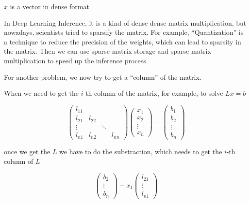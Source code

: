 $x$ is a vector in dense format

\begin{note}
    In Deep Learning Inference, it is a kind of dense dense matrix multiplication, but nowadays, scientists tried to sparsify the matrix. For example, ``Quantization'' is a technique to reduce the precision of the weights, which can lead to sparsity in the matrix. Then we can use sparse matrix storage and sparse matrix multiplication to speed up the inference process.
\end{note}

\begin{eg}
    For another problem, we now try to get a ``column'' of the matrix.
\end{eg}

When we need to get the $i$-th column of the matrix, for example, to solve $Lx = b$

\begin{equation*}
  \begin{pmatrix}
    l_{11} &&& \\
    l_{21} & l_{22} && \\
    \vdots&& \ddots & \\
    l_{n1} & l_{n2} & & l_{nn}
  \end{pmatrix}
  \begin{pmatrix}
    x_1 \\ x_2 \\ \vdots \\ x_n
  \end{pmatrix}
=
\begin{pmatrix}
  b_1\\ b_2 \\ \vdots \\ b_n
\end{pmatrix}
\end{equation*}

once we get the $L$ we have to do the substraction, which needs to get the $i$-th column of $L$

\begin{equation*}
  \begin{pmatrix}
    b_2 \\ \vdots \\ b_n
  \end{pmatrix}
- x_1
\begin{pmatrix}
  l_{21} \\ \vdots \\ l_{n1}
\end{pmatrix}
\end{equation*}

